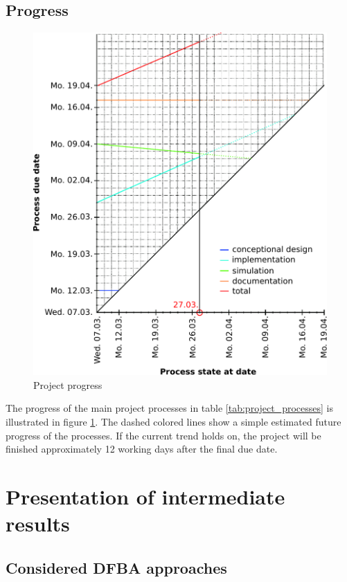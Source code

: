 \documentclass[a4paper,10pt]{article}
\begin{document}
\subsection{Progress}

\begin{figure}[h!]
 \centering
 \includegraphics[width=\linewidth]{progress.pdf}
 \caption{Project progress}
 \label{fig:project_progress}
\end{figure}

The progress of the main project processes in table \ref{tab:project_processes} is illustrated in figure \ref{fig:project_progress}. 
The dashed colored lines show a simple estimated future progress of the processes. If the current trend holds on, the project will be
finished approximately 12 working days after the final due date.


\newpage

\section{Presentation of intermediate results}
\subsection{Considered DFBA approaches}\label{ssec:considered_dfba_approaches}
\end{document}

